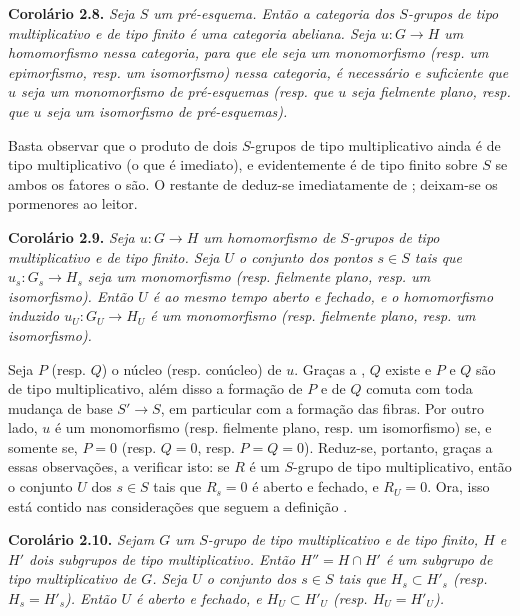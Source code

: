 \medskip
\noindent{}\textbf{Corolário 2.8.}
\textit{Seja \(S\)
um pré-esquema. Então a categoria dos \(S\)-grupos de tipo
multiplicativo e de tipo finito é uma categoria abeliana.
Seja \(u:G\to H\) um
homomorfismo nessa categoria, para que ele seja um monomorfismo (resp.
um epimorfismo, resp. um isomorfismo) nessa categoria, é necessário e
suficiente que \(u\) seja um monomorfismo de pré-esquemas (resp. que
\(u\) seja fielmente plano, resp. que \(u\) seja um isomorfismo de
pré-esquemas).}

Basta observar que o produto de dois \(S\)-grupos de tipo multiplicativo
ainda é de tipo multiplicativo (o que é imediato), e evidentemente
é de tipo finito sobre \(S\) se ambos os fatores o são. O restante de
 deduz-se imediatamente de
; deixam-se os pormenores ao leitor.

\medskip
\noindent{}\textbf{Corolário 2.9.}
\textit{Seja \(u:G\to H\) um homomorfismo de \(S\)-grupos de tipo
multiplicativo e de tipo finito. Seja \(U\) o conjunto dos pontos \(s\in S\)
tais que \(u_s:G_s\to H_s\) seja um monomorfismo (resp.
fielmente plano, resp. um isomorfismo). Então \(U\) é ao mesmo
tempo aberto e fechado, e o homomorfismo induzido \(u_U:G_U\to H_U\) é um
monomorfismo (resp. fielmente plano, resp. um
isomorfismo).}

Seja \(P\) (resp. \(Q\)) o núcleo (resp. conúcleo) de \(u\).
Graças a , \(Q\) existe e
\(P\) e \(Q\) são de tipo multiplicativo, além disso a formação de
\(P\) e de \(Q\) comuta com toda mudança de base \(S'\to S\), em
particular com a formação das fibras. Por outro lado, \(u\) é um
monomorfismo (resp. fielmente plano, resp. um isomorfismo) se, e
somente se, \(P=0\) (resp. \(Q=0\), resp. \(P=Q=0\)). Reduz-se,
portanto, graças a essas observações, a verificar isto: se \(R\) é
um \(S\)-grupo de tipo multiplicativo, então o conjunto \(U\) dos
\(s\in S\) tais que \(R_s=0\) é aberto e fechado, e \(R_U=0\).
Ora, isso está contido nas considerações que seguem a definição
.

\medskip
\noindent{}\textbf{Corolário 2.10.}
\textit{Sejam \(G\) um \(S\)-grupo de tipo multiplicativo e de tipo
finito, \(H\) e \(H'\) dois subgrupos de tipo multiplicativo. Então
\(H''=H\cap H'\) é
um subgrupo de tipo multiplicativo de \(G\).
Seja \(U\) o conjunto
dos \(s\in S\) tais que \(H_s\subset H'_s\) (resp. \(H_s=H'_s\)).
Então \(U\) é aberto e fechado, e \(H_U\subset H'_U\) (resp.
\(H_U=H'_U\)).}

